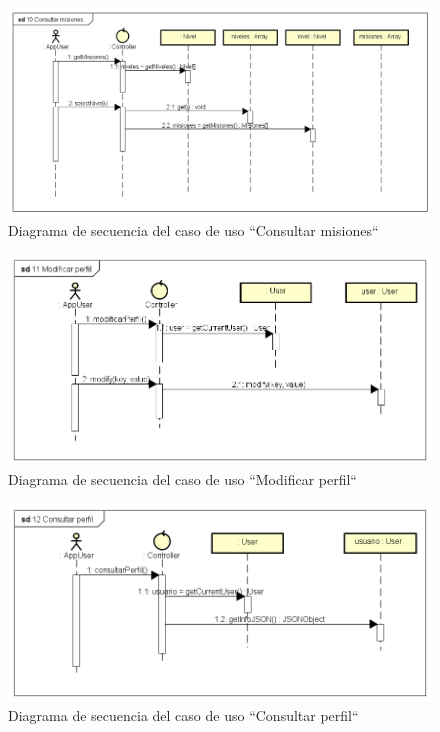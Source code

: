 \documentclass[twoside]{report}
\begin{document}
\begin{figure}[H]
\includegraphics[scale=0.5]{images/sequence/checkMissions}
\caption{Diagrama de secuencia del caso de uso “Consultar misiones“}
\end{figure}

\begin{figure}[H]
\includegraphics[scale=0.5]{images/sequence/modifyProfile}
\caption{Diagrama de secuencia del caso de uso “Modificar perfil“}
\end{figure}

\begin{figure}[H]
\includegraphics[scale=0.5]{images/sequence/checkProfile}
\caption{Diagrama de secuencia del caso de uso “Consultar perfil“}
\end{figure}
\end{document}
